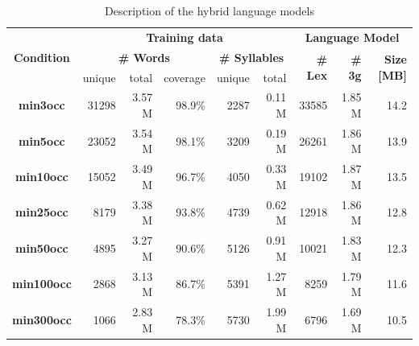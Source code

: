 \documentclass[a4paper]{article}
\begin{document}
\begin{table}[t]
\centering
\begin{tabular}{|c||r|r|r||r|r||r|r|r|}
\hline
\multirow{4}{*}{\bf Condition}  & \multicolumn{5}{c||}{\multirow{2}{*}{\bf Training data}}  & \multicolumn{3}{c|}{\multirow{2}{*}{\bf  Language Model}} 	\\
 & \multicolumn{5}{c||}{} & \multicolumn{3}{c|}{}  															\\
\cline{2-9}
\cline{2-9}
 & \multicolumn{3}{c||}{\bf \# Words} & \multicolumn{2}{c||}{\bf \# Syllables} & \multirow{2}{*}{\bf \# Lex} & \multirow{2}{*}{\bf \# 3g} & \multirow{2}{*}{\bf Size {[}MB{]} } \\
\cline{2-6}
	& {unique}  & {total} & {coverage}   & {unique} & {total} &  & & 	\\ \hline
{\bf min3occ}   & 31298  & 3.57 M  & 98.9\% & 2287 &  0.11 M & 33585  &  1.85 M & 14.2			\\ \hline
{\bf min5occ}   & 23052  & 3.54 M  & 98.1\% & 3209 &  0.19 M & 26261  &  1.86 M & 13.9	 		\\ \hline
{\bf min10occ}  & 15052  & 3.49 M  & 96.7\% & 4050 &  0.33 M & 19102  &  1.87 M & 13.5	 		\\ \hline
{\bf min25occ}  &  8179  & 3.38 M  & 93.8\% & 4739 &  0.62 M & 12918  &  1.86 M & 12.8	 		\\ \hline
{\bf min50occ}  &  4895  & 3.27 M  & 90.6\% & 5126 &  0.91 M & 10021  &  1.83 M & 12.3	 		\\ \hline
{\bf min100occ} &  2868  & 3.13 M  & 86.7\% & 5391 & 1.27 M  &  8259  &  1.79 M & 11.6	 		\\ \hline
{\bf min300occ} &  1066  & 2.83 M  & 78.3\% & 5730 & 1.99 M  &  6796  &  1.69 M & 10.5			\\ \hline
\end{tabular}
\caption{Description of the hybrid language models} \label{Tab:LMs}
\end{table}
\end{document}
